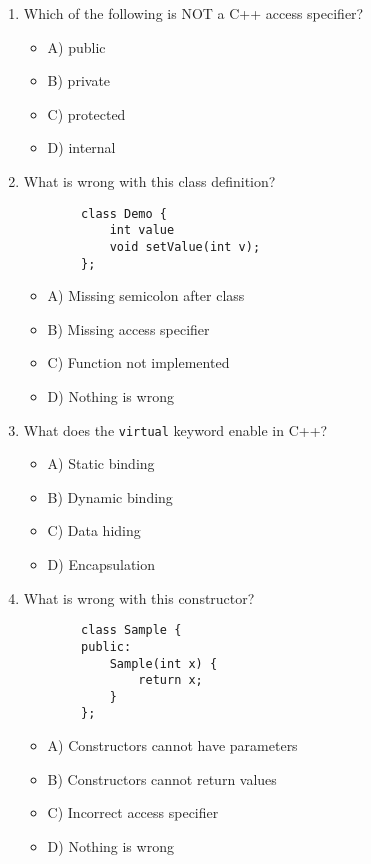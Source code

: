 \documentclass[a4paper,12pt]{article}
\begin{document}
\begin{enumerate}
    \item Which of the following is NOT a C++ access specifier?
    \begin{itemize}
        \item A) public
        \item B) private
        \item C) protected
        \item D) internal
    \end{itemize}

    \item What is wrong with this class definition?

    \lstset{language=C++}
    \begin{lstlisting}
        class Demo {
            int value
            void setValue(int v);
        };
    \end{lstlisting}
    
    \begin{itemize}
        \item A) Missing semicolon after class
        \item B) Missing access specifier
        \item C) Function not implemented
        \item D) Nothing is wrong
    \end{itemize}

    \item What does the \verb|virtual| keyword enable in C++?
    \begin{itemize}
        \item A) Static binding
        \item B) Dynamic binding
        \item C) Data hiding
        \item D) Encapsulation
    \end{itemize}

    \item What is wrong with this constructor?

    \lstset{language=C++}
    \begin{lstlisting}
        class Sample {
        public:
            Sample(int x) {
                return x;
            }
        };
    \end{lstlisting}
    
    \begin{itemize}
        \item A) Constructors cannot have parameters
        \item B) Constructors cannot return values
        \item C) Incorrect access specifier
        \item D) Nothing is wrong
    \end{itemize}


\end{enumerate}
\end{document}
